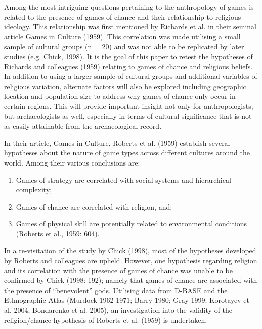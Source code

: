 \documentclass[%
	]{ijsra}
\begin{document}
Among the most intriguing questions pertaining to the anthropology of games is related to the presence of games of chance and their relationship to religious ideology. This relationship was first mentioned by Richards et al. in their seminal article Games in Culture (1959). This correlation was made utilising a small sample of cultural groups (n = 20) and was not able to be replicated by later studies (e.g. Chick, 1998). It is the goal of this paper to retest the hypotheses of Richards and colleagues (1959) relating to games of chance and religious beliefs. In addition to using a larger sample of cultural groups and additional variables of religious variation, alternate factors will also be explored including geographic location and population size to address why games of chance only occur in certain regions. This will provide important insight not only for anthropologists, but archaeologists as well, especially in terms of cultural significance that is not as easily attainable from the archaeological record.


In their article, Games in Culture, Roberts et al. (1959) establish several hypotheses about the nature of game types across different cultures around the world. Among their various conclusions are:

\begin{enumerate}
\item Games of strategy are correlated with social systems and hierarchical complexity;
\item Games of chance are correlated with religion, and;
\item Games of physical skill are potentially related to environmental conditions (Roberts et al., 1959: 604).
\end{enumerate}

In a re-visitation of the study by Chick (1998), most of the hypotheses developed by Roberts and colleagues are upheld. However, one hypothesis regarding religion and its correlation with the presence of games of chance was unable to be confirmed by Chick (1998: 192); namely that games of chance are associated with the presence of “benevolent” gods. Utilising data from D-BASE and the Ethnographic Atlas (Murdock 1962-1971; Barry 1980; Gray 1999; Korotayev et al. 2004; Bondarenko et al. 2005), an investigation into the validity of the religion/chance hypothesis of Roberts et al. (1959) is undertaken.
\end{document}
